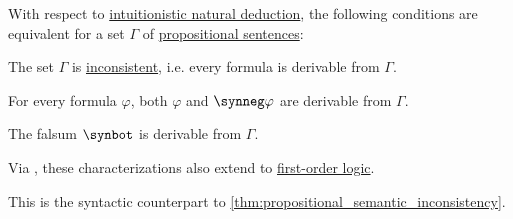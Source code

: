 \begin{proposition}\label{thm:propositional_syntactic_inconsistency}
  With respect to \hyperref[def:propositional_natural_deduction]{intuitionistic natural deduction}, the following conditions are equivalent for a set \( \Gamma \) of \hyperref[def:propositional_formula]{propositional sentences}:
  \begin{thmenum}
     The set \( \Gamma \) is \hyperref[def:consistent_set_of_sentences]{inconsistent}, i.e. every formula is derivable from \( \Gamma \).

     For every formula \( \varphi \), both \( \varphi \) and \( \synneg \varphi \) are derivable from \( \Gamma \).

     The falsum \( \synbot \) is derivable from \( \Gamma \).
  \end{thmenum}
\end{proposition}
\begin{comments}
  \item Via , these characterizations also extend to \hyperref[def:first_order_logic]{first-order logic}.

  \item This is the syntactic counterpart to \cref{thm:propositional_semantic_inconsistency}.
\end{comments}

